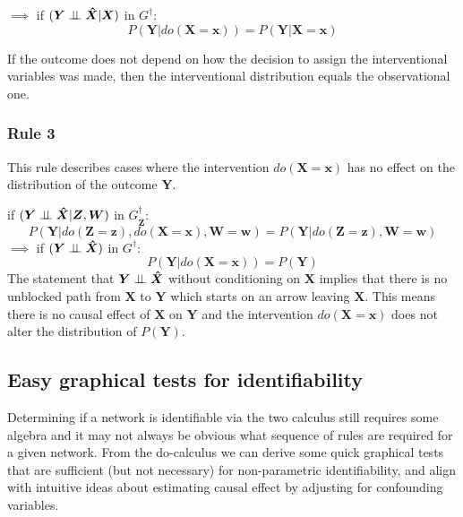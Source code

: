 \documentclass[11pt,a4paper]{article}
\begin{document}
$\implies$ if  $(\boldsymbol{Y} \perp\!\!\!\perp \boldsymbol{\hat{X}}|\boldsymbol{X})$ in $G^{\dagger}$:
\begin{equation}
\label{eq:Do22}
P(\boldsymbol{Y}|do(\boldsymbol{X}=\boldsymbol{x})) = P(\boldsymbol{Y}|\boldsymbol{X}=\boldsymbol{x})
\end{equation}

If the outcome does not depend on how the decision to assign the interventional variables was made, then the interventional distribution equals the observational one. 

\subsubsection{Rule 3}
This rule describes cases where the intervention $do(\boldsymbol{X}=\boldsymbol{x})$ has no effect on the distribution of the outcome $\boldsymbol{Y}$. 

if $(\boldsymbol{Y} \perp\!\!\!\perp \boldsymbol{\hat{X}} |\boldsymbol{Z},\boldsymbol{W})$ in $G^{\dagger}_{\boldsymbol{\overline{Z}}}$:
\begin{equation}
\label{eq:Do3}
P(\boldsymbol{Y}|do(\boldsymbol{Z}=\boldsymbol{z}),do(\boldsymbol{X}=\boldsymbol{x}),\boldsymbol{W}=\boldsymbol{w}) = P(\boldsymbol{Y}|do(\boldsymbol{Z}=\boldsymbol{z}),\boldsymbol{W}=\boldsymbol{w})
\end{equation}
$\implies$ if  $(\boldsymbol{Y} \perp\!\!\!\perp \boldsymbol{\hat{X}})$ in $G^{\dagger}$:
\begin{equation}
\label{eq:Do32}
P(\boldsymbol{Y}|do(\boldsymbol{X}=\boldsymbol{x})) = P(\boldsymbol{Y})
\end{equation}
The statement that $\boldsymbol{Y} \perp\!\!\!\perp \boldsymbol{\hat{X}}$ without conditioning on $\boldsymbol{X}$ implies that there is no unblocked path from $\boldsymbol{X}$ to $\boldsymbol{Y}$ which starts on an arrow leaving $\boldsymbol{X}$. This means there is no causal effect of $\boldsymbol{X}$ on $\boldsymbol{Y}$ and the intervention $do(\boldsymbol{X}=\boldsymbol{x})$ does not alter the distribution of $P(\boldsymbol{Y})$.

\subsection{Easy graphical tests for identifiability}
Determining if a network is identifiable via the two calculus still requires some algebra and it may not always be obvious what sequence of rules are required for a given network. From the do-calculus we can derive some quick graphical tests that are sufficient (but not necessary) for non-parametric identifiability, and align with intuitive ideas about estimating causal effect by adjusting for confounding variables. 
\end{document}
